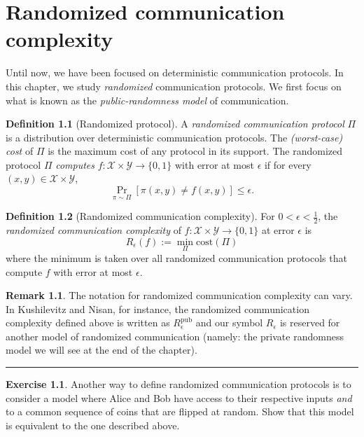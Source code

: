 \documentclass[11pt,oneside]{book}
\theoremstyle{plain}
\theoremstyle{definition}
\newtheorem{definition}{Definition}
\newtheorem{exercise}{Exercise}
\newtheorem{remark}{Remark}
\theoremstyle{plain}
\newcommand{\calX}{\mathcal{X}}
\newcommand{\calY}{\mathcal{Y}}
\newcommand{\cost}{\mathrm{cost}}
\newcommand{\exercises}{\bigskip \noindent\rule{8cm}{0.4pt} \medskip}
\begin{document}
\chapter[CH04]{Randomized communication complexity}



Until now, we have been focused on deterministic communication protocols. In this chapter, we study \emph{randomized} communication protocols. We first focus on what is known as the \emph{public-randomness model} of communication. 


\newpage

\begin{definition}[Randomized protocol]
	A \emph{randomized communication protocol} $\Pi$ is a distribution over deterministic communication protocols. The \emph{(worst-case) cost} of $\Pi$ is the maximum cost of any protocol in its support. The randomized protocol $\Pi$ \emph{computes} $f : \calX \times \calY \to \{0,1\}$ with error at most $\epsilon$ if for every $(x,y) \in \calX \times \calY$,
	\[
	\Pr_{\pi \sim \Pi}[ \pi(x,y) \neq f(x,y) ] \le \epsilon.
	\]
\end{definition}


\begin{definition}[Randomized communication complexity]
	For $0 < \epsilon < \frac12$, the \emph{randomized communication complexity} of $f : \calX \times \calY \to \{0,1\}$ at error $\epsilon$ is
	\[
	R_\epsilon(f) := \min_{\Pi} \cost(\Pi)
	\]
	where the minimum is taken over all randomized communication protocols that compute $f$ with error at most $\epsilon$.
\end{definition}

\begin{remark}
	The notation for randomized communication complexity can vary. In Kushilevitz and Nisan, for instance, the randomized communication complexity defined above is written as $R^{\mathrm{pub}}_\epsilon$ and our symbol $R_\epsilon$ is reserved for another model of randomized communication (namely: the private randomness model we will see at the end of the chapter).
\end{remark}

\exercises

\begin{exercise}
	Another way to define randomized communication protocols is to consider a model where Alice and Bob have access to their respective inputs \emph{and} to a common sequence of coins that are flipped at random. Show that this model is equivalent to the one described above.
\end{exercise}
\end{document}
